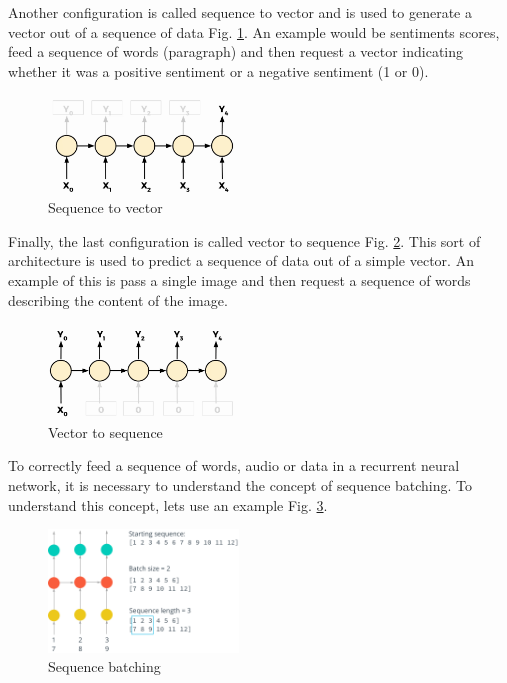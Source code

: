 \documentclass{article}
\begin{document}
Another configuration is called sequence to vector and is used to generate a vector out of a sequence of data Fig. \ref{fig:f22}. An example would be sentiments scores, feed a sequence of words (paragraph) and then request a vector indicating whether it was a positive sentiment or a negative sentiment (1 or 0).

\begin{figure}[ht]
    \centering
    \includegraphics[width=0.45\textwidth,height=0.45\textheight,keepaspectratio]{images/sequence_vector.png}
    \captionsetup{justification=centering}
    \caption{Sequence to vector}
    \label{fig:f22}
\end{figure}

Finally, the last configuration is called vector to sequence Fig. \ref{fig:f23}. This sort of architecture is used to predict a sequence of data out of a simple vector. An example of this is pass a single image and then request a sequence of words describing the content of the image. 

\begin{figure}[ht]
    \centering
    \includegraphics[width=0.45\textwidth,height=0.45\textheight,keepaspectratio]{images/vector_sequence.png}
    \captionsetup{justification=centering}
    \caption{Vector to sequence}
    \label{fig:f23}
\end{figure}

To correctly feed a sequence of words, audio or data in a recurrent neural network, it is necessary to understand the concept of sequence batching. To understand this concept, lets use an example Fig. \ref{fig:f24}. 

\begin{figure}[ht]
    \centering
    \includegraphics[width=0.45\textwidth,height=0.45\textheight,keepaspectratio]{images/sequence_batching.png}
    \captionsetup{justification=centering}
    \caption{Sequence batching}
    \label{fig:f24}
\end{figure}
\end{document}
